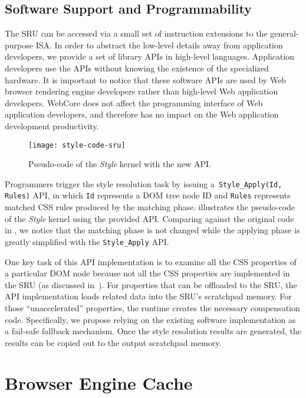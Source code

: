 \subsection{Software Support and Programmability}
\label{sec:sru:sw}

The SRU can be accessed via a small set of instruction extensions to the general-purpose ISA. In order to abstract the low-level details away from application developers, we provide a set of library APIs in high-level languages. Application developers use the APIs without knowing the existence of the specialized hardware. It is important to notice that these software APIs are used by Web browser rendering engine developers rather than high-level Web application developers. WebCore does not affect the programming interface of Web application developers, and therefore has no impact on the Web application development productivity.

\begin{figure}[h]
\centering
\captionsetup{width=.8\columnwidth}
\texttt{[image: style-code-sru]}
\caption{\small{Pseudo-code of the \textit{Style} kernel with the new API.}}
\label{fig:style-code-sru}
\end{figure}

Programmers trigger the style resolution task by issuing a~\texttt{Style\_Apply(Id, Rules)} API, in which \texttt{Id} represents a DOM tree node ID and \texttt{Rules} represents matched CSS rules produced by the matching phase.  illustrates the pseudo-code of the \textit{Style} kernel using the provided API. Comparing against the original code in , we notice that the matching phase is not changed while the applying phase is greatly simplified with the \texttt{Style\_Apply} API.

One key task of this API implementation is to examine all the CSS properties of a particular DOM node because not all the CSS properties are implemented in the SRU (as discussed in~). For properties that can be offloaded to the SRU, the API implementation loads related data into the SRU's scratchpad memory. For those ``unaccelerated'' properties, the runtime creates the necessary compensation code. Specifically, we propose relying on the existing software implementation as a fail-safe fallback mechanism. Once the style resolution results are generated, the results can be copied out to the output scratchpad memory.

\section{Browser Engine Cache}
\label{sec:cache}


